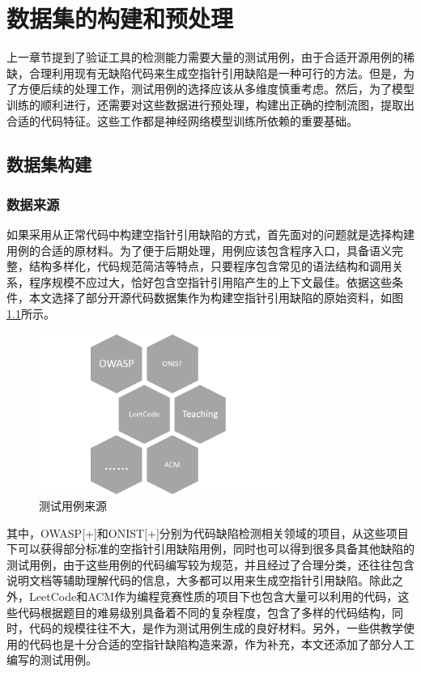 \chapter{数据集的构建和预处理}

上一章节提到了验证工具的检测能力需要大量的测试用例，由于合适开源用例的稀缺，合理利用现有无缺陷代码来生成空指针引用缺陷是一种可行的方法。但是，为了方便后续的处理工作，测试用例的选择应该从多维度慎重考虑。然后，为了模型训练的顺利进行，还需要对这些数据进行预处理，构建出正确的控制流图，提取出合适的代码特征。这些工作都是神经网络模型训练所依赖的重要基础。

\section{数据集构建}
\subsection{数据来源}
如果采用从正常代码中构建空指针引用缺陷的方式，首先面对的问题就是选择构建用例的合适的原材料。为了便于后期处理，用例应该包含程序入口，具备语义完整，结构多样化，代码规范简洁等特点，只要程序包含常见的语法结构和调用关系，程序规模不应过大，恰好包含空指针引用陷产生的上下文最佳。依据这些条件，本文选择了部分开源代码数据集作为构建空指针引用缺陷的原始资料，如图\ref{fig:figure4-1}所示。

\begin{figure}
	\centering
	\includegraphics[width=0.70\textwidth]{figures/resource4-1}
	\caption{测试用例来源}\label{fig:figure4-1}
\end{figure}

其中，OWASP[+]和ONIST[+]分别为代码缺陷检测相关领域的项目，从这些项目下可以获得部分标准的空指针引用缺陷用例，同时也可以得到很多具备其他缺陷的测试用例，由于这些用例的代码编写较为规范，并且经过了合理分类，还往往包含说明文档等辅助理解代码的信息，大多都可以用来生成空指针引用缺陷。除此之外，LeetCode和ACM作为编程竞赛性质的项目下也包含大量可以利用的代码，这些代码根据题目的难易级别具备着不同的复杂程度，包含了多样的代码结构，同时，代码的规模往往不大，是作为测试用例生成的良好材料。另外，一些供教学使用的代码也是十分合适的空指针缺陷构造来源，作为补充，本文还添加了部分人工编写的测试用例。

